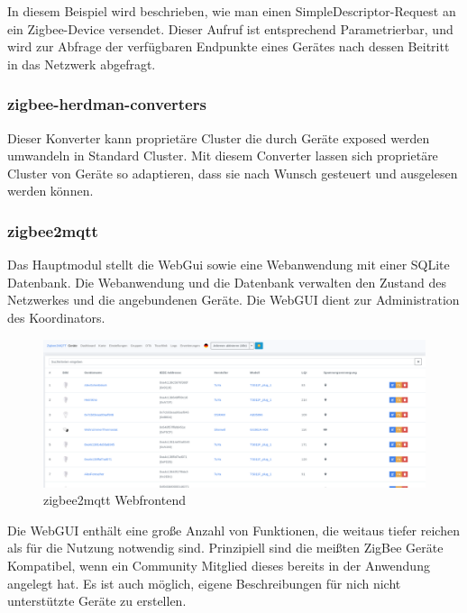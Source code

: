 In diesem Beispiel wird beschrieben, wie man einen SimpleDescriptor-Request an ein Zigbee-Device versendet. Dieser Aufruf ist entsprechend Parametrierbar,
und wird zur Abfrage der verfügbaren Endpunkte eines Gerätes nach dessen Beitritt in das Netzwerk abgefragt.

\subsubsection{zigbee-herdman-converters}

Dieser Konverter kann proprietäre Cluster die durch Geräte exposed werden umwandeln in Standard Cluster. Mit diesem Converter lassen sich proprietäre Cluster von Geräte
so adaptieren, dass sie nach Wunsch gesteuert und ausgelesen werden können.

\subsubsection{zigbee2mqtt}

Das Hauptmodul stellt die WebGui sowie eine Webanwendung mit einer SQLite Datenbank. Die Webanwendung und die Datenbank
verwalten den Zustand des Netzwerkes und die angebundenen Geräte. Die WebGUI dient zur Administration des Koordinators. 

\begin{figure}[H]
  \centering
  \includegraphics[width=1\textwidth]{media/z2m.png}
  \caption{zigbee2mqtt Webfrontend}
\end{figure}

Die WebGUI enthält eine große Anzahl von Funktionen, die weitaus tiefer reichen als für die Nutzung notwendig sind.
Prinzipiell sind die meißten ZigBee Geräte Kompatibel, wenn ein Community Mitglied dieses bereits in der Anwendung
angelegt hat. Es ist auch möglich, eigene Beschreibungen für nich nicht unterstützte Geräte zu erstellen.\\

